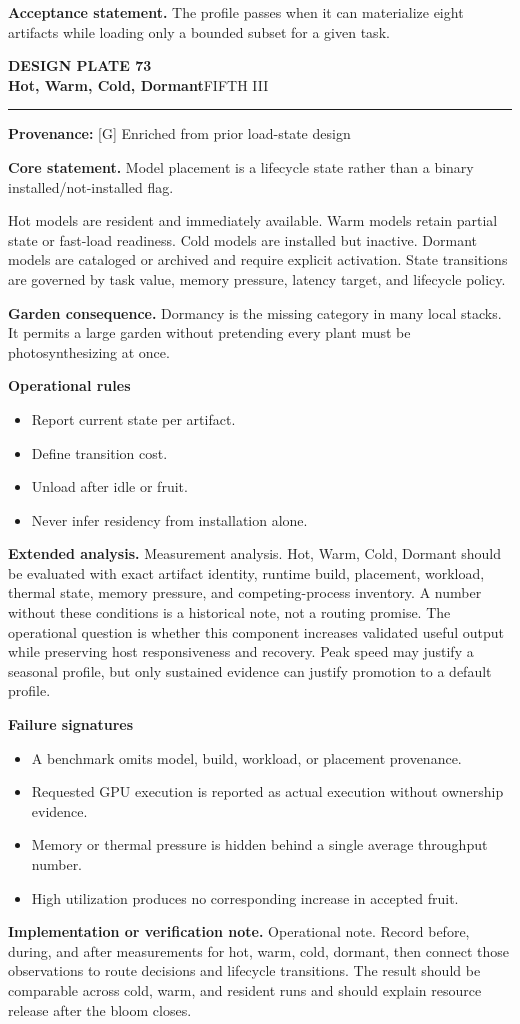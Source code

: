 \documentclass[10pt,letterpaper,oneside]{article}
\newcommand{\prov}[1]{\textcolor{gardenBlue}{\sffamily\footnotesize\textbf{Provenance:} #1}}
\newcommand{\platetitle}[3]{%
  \begin{minipage}[t][0.54in][t]{\textwidth}
  {\sffamily\bfseries\color{gardenDeep}\fontsize{9}{10}\selectfont DESIGN PLATE #1}\\[-1pt]
  {\sffamily\bfseries\color{gardenInk}\fontsize{16.5}{18}\selectfont #2}\hfill{\sffamily\color{gardenGreen}\large #3}
  \end{minipage}\vspace{-2pt}\hrule\vspace{5pt}}
\begin{document}
\begin{acceptbox}
\textbf{Acceptance statement.} The profile passes when it can materialize eight artifacts while loading only a bounded subset for a given task.
\end{acceptbox}
\newpage
\platetitle{73}{Hot, Warm, Cold, Dormant}{FIFTH III}
\prov{[G] Enriched from prior load-state design}
\fontsize{8.85}{10.45}\selectfont
\begin{corebox}
\textbf{Core statement.} Model placement is a lifecycle state rather than a binary installed/not-installed flag.
\end{corebox}
Hot models are resident and immediately available. Warm models retain partial state or fast-load readiness. Cold models are installed but inactive. Dormant models are cataloged or archived and require explicit activation. State transitions are governed by task value, memory pressure, latency target, and lifecycle policy.

\textbf{Garden consequence.} Dormancy is the missing category in many local stacks. It permits a large garden without pretending every plant must be photosynthesizing at once.

\textbf{Operational rules}
\begin{itemize}
\item Report current state per artifact.
\item Define transition cost.
\item Unload after idle or fruit.
\item Never infer residency from installation alone.
\end{itemize}
\textbf{Extended analysis.} Measurement analysis. Hot, Warm, Cold, Dormant should be evaluated with exact artifact identity, runtime build, placement, workload, thermal state, memory pressure, and competing-process inventory. A number without these conditions is a historical note, not a routing promise. The operational question is whether this component increases validated useful output while preserving host responsiveness and recovery. Peak speed may justify a seasonal profile, but only sustained evidence can justify promotion to a default profile.

\textbf{Failure signatures}
\begin{itemize}
\item A benchmark omits model, build, workload, or placement provenance.
\item Requested GPU execution is reported as actual execution without ownership evidence.
\item Memory or thermal pressure is hidden behind a single average throughput number.
\item High utilization produces no corresponding increase in accepted fruit.
\end{itemize}
\textbf{Implementation or verification note.} Operational note. Record before, during, and after measurements for hot, warm, cold, dormant, then connect those observations to route decisions and lifecycle transitions. The result should be comparable across cold, warm, and resident runs and should explain resource release after the bloom closes.
\end{document}
